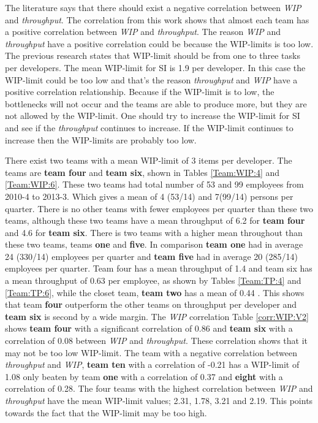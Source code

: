 \documentclass[UKenglish]{ifimaster}  %
\begin{document}
The literature says that there should exist a negative correlation between \textit{WIP} and \textit{throughput}. The correlation from this work shows that almost each team has a positive correlation between \textit{WIP} and \textit{throughput}. The reason \textit{WIP} and \textit{throughput} have a positive correlation could be because the WIP-limits is too low. The previous research states that WIP-limit should be from one to three tasks per developers. The mean WIP-limit for SI is 1.9 per developer. In this case the WIP-limit could be too low and that's the reason \textit{throughput} and \textit{WIP} have a positive correlation relationship. Because if the WIP-limit is to low, the bottlenecks will not occur and the teams are able to produce more, but they are not allowed by the WIP-limit. One should try to increase the WIP-limit for SI and see if the \textit{throughput} continues to increase. If the WIP-limit continues to increase then the WIP-limits are probably too low.


There exist two teams with a mean WIP-limit of 3 items per developer. The teams are  \textbf{team four} and \textbf{team six}, shown in Tables \ref{Team:WIP:4} and \ref{Team:WIP:6}. These two teams had total number of 53 and 99 employees from 2010-4 to 2013-3. Which gives a mean of 4 (53/14) and 7(99/14) persons per quarter. There is no other teams with fewer employees per quarter than these two teams, although these two teams have a mean throughput of 6.2 for \textbf{team four} and 4.6 for \textbf{team six}. There is two teams with a higher mean throughout than these two teams, teams \textbf{one} and \textbf{five}. In comparison \textbf{team one} had in average 24 (330/14) employees per quarter and \textbf{team five} had in average 20 (285/14) employees per quarter. Team four has a mean throughput of 1.4 and team six has a mean throughput of 0.63 per employee, as shown by Tables \ref{Team:TP:4} and \ref{Team:TP:6}, while the closet team, \textbf{team two} has a mean of 0.44 . This shows that team \textbf{four} outperform the other teams on throughput per developer and \textbf{team six} is second by a wide margin. The \textit{WIP} correlation Table \ref{corr:WIP:V2} shows \textbf{team four} with a significant correlation of 0.86 and \textbf{team six} with a correlation of 0.08 between \textit{WIP} and \textit{throughput}.  These correlation shows that it may not be too low WIP-limit. The team with a negative correlation between \textit{throughput} and \textit{WIP}, \textbf{team ten} with a correlation of -0.21 has a WIP-limit of 1.08 only beaten by team \textbf{one} with a correlation of 0.37 and \textbf{eight} with a correlation of 0.28. The four teams with the highest correlation between \textit{WIP} and \textit{throughput} have the mean WIP-limit values; 2.31, 1.78, 3.21 and 2.19.   This points towards the fact that the WIP-limit may be too high. 
\end{document}
